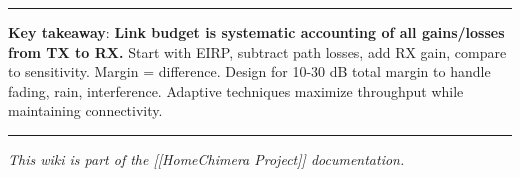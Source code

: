 \begin{center}\rule{0.5\linewidth}{0.5pt}\end{center}

\textbf{Key takeaway}: \textbf{Link budget is systematic accounting of
all gains/losses from TX to RX.} Start with EIRP, subtract path losses,
add RX gain, compare to sensitivity. Margin = difference. Design for
10-30 dB total margin to handle fading, rain, interference. Adaptive
techniques maximize throughput while maintaining connectivity.

\begin{center}\rule{0.5\linewidth}{0.5pt}\end{center}

\emph{This wiki is part of the {[}{[}Home\textbar Chimera Project{]}{]}
documentation.}
